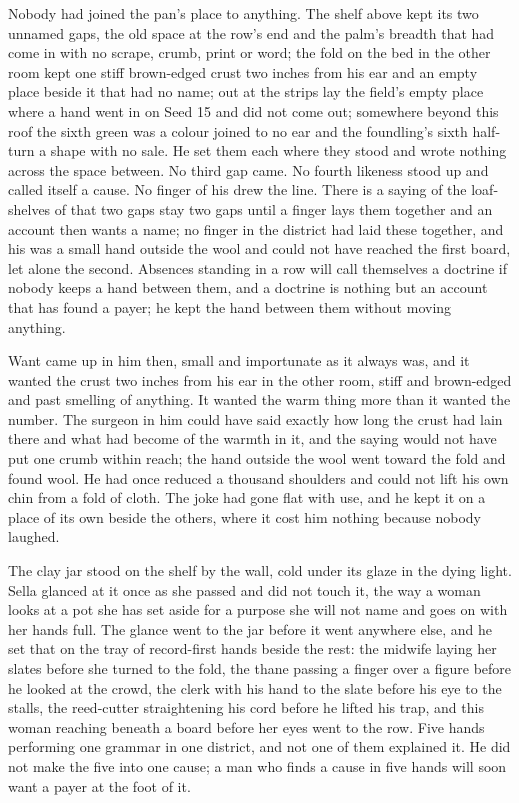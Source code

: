 Nobody had joined the pan's place to anything. The shelf above kept its two unnamed gaps, the old space at the row's end and the palm's breadth that had come in with no scrape, crumb, print or word; the fold on the bed in the other room kept one stiff brown-edged crust two inches from his ear and an empty place beside it that had no name; out at the strips lay the field's empty place where a hand went in on Seed 15 and did not come out; somewhere beyond this roof the sixth green was a colour joined to no ear and the foundling's sixth half-turn a shape with no sale. He set them each where they stood and wrote nothing across the space between. No third gap came. No fourth likeness stood up and called itself a cause. No finger of his drew the line. There is a saying of the loaf-shelves of  that two gaps stay two gaps until a finger lays them together and an account then wants a name; no finger in the district had laid these together, and his was a small hand outside the wool and could not have reached the first board, let alone the second. Absences standing in a row will call themselves a doctrine if nobody keeps a hand between them, and a doctrine is nothing but an account that has found a payer; he kept the hand between them without moving anything.

Want came up in him then, small and importunate as it always was, and it wanted the crust two inches from his ear in the other room, stiff and brown-edged and past smelling of anything. It wanted the warm thing more than it wanted the number. The surgeon in him could have said exactly how long the crust had lain there and what had become of the warmth in it, and the saying would not have put one crumb within reach; the hand outside the wool went toward the fold and found wool. He had once reduced a thousand shoulders and could not lift his own chin from a fold of cloth. The joke had gone flat with use, and he kept it on a place of its own beside the others, where it cost him nothing because nobody laughed.

The clay jar stood on the shelf by the wall, cold under its glaze in the dying light. Sella glanced at it once as she passed and did not touch it, the way a woman looks at a pot she has set aside for a purpose she will not name and goes on with her hands full. The glance went to the jar before it went anywhere else, and he set that on the tray of record-first hands beside the rest: the midwife laying her slates before she turned to the fold, the thane passing a finger over a figure before he looked at the crowd, the clerk with his hand to the slate before his eye to the stalls, the reed-cutter straightening his cord before he lifted his trap, and this woman reaching beneath a board before her eyes went to the row. Five hands performing one grammar in one district, and not one of them explained it. He did not make the five into one cause; a man who finds a cause in five hands will soon want a payer at the foot of it.

